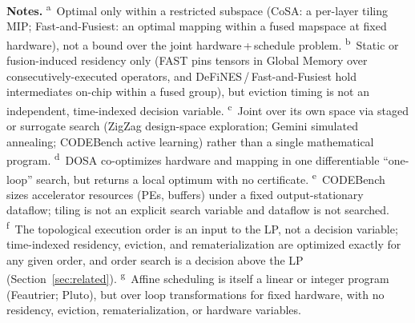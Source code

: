 \begin{table}[t]
\vspace{2pt}
{\footnotesize\raggedright
\textbf{Notes.}
\textsuperscript{a}~Optimal only within a restricted subspace
(CoSA: a per-layer tiling MIP; Fast-and-Fusiest: an optimal mapping within a
fused mapspace at fixed hardware), not a bound over the joint
hardware\,+\,schedule problem.
\textsuperscript{b}~Static or fusion-induced residency only (FAST pins
tensors in Global Memory over consecutively-executed operators, and
DeFiNES\,/\,Fast-and-Fusiest hold intermediates on-chip within a fused
group), but eviction timing is not an independent, time-indexed decision
variable.
\textsuperscript{c}~Joint over its own space via staged or surrogate search
(ZigZag design-space exploration; Gemini simulated annealing; CODEBench
active learning) rather than a single mathematical program.
\textsuperscript{d}~DOSA co-optimizes hardware and mapping in one
differentiable ``one-loop'' search, but returns a local optimum with no
certificate.
\textsuperscript{e}~CODEBench sizes accelerator resources (PEs, buffers)
under a fixed output-stationary dataflow; tiling is not an explicit search
variable and dataflow is not searched.
\textsuperscript{f}~The topological execution order is an input to the
LP, not a decision variable; time-indexed residency, eviction, and
rematerialization are optimized exactly for any given order, and order
search is a decision above the LP (Section~\ref{sec:related}).
\textsuperscript{g}~Affine scheduling is itself a linear or integer program
(Feautrier; Pluto), but over loop transformations for fixed hardware, with no
residency, eviction, rematerialization, or hardware variables.
\par}
\end{table}

